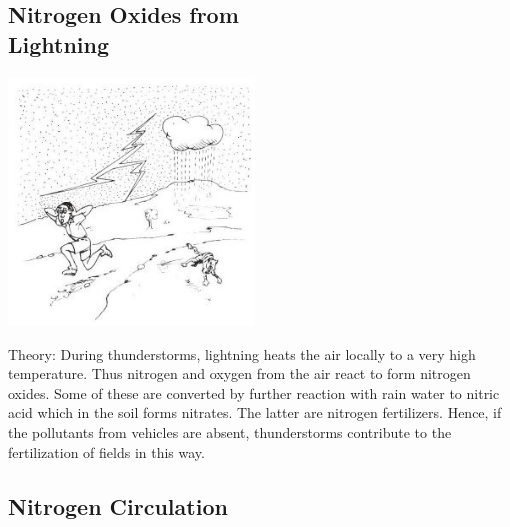 \begin{multicols}{2}
\subsection[Nitrogen Oxides from Lightning]{Nitrogen Oxides from \hfill \\ Lightning}

\begin{center}
\includegraphics[width=0.49\textwidth]{./img/source/nitrogen-lightning-2.jpg}
\end{center}

\begin{description*}
\item[Theory:]{During thunderstorms, lightning heats
the air locally to a very high temperature. Thus
nitrogen and oxygen from the air react to form
nitrogen oxides. Some of these are converted by
further reaction with rain water to nitric acid
which in the soil forms nitrates. The latter are
nitrogen fertilizers. Hence, if the pollutants
from vehicles are absent,
thunderstorms contribute to the fertilization of
fields in this way.}
\end{description*}

\columnbreak

\subsection{Nitrogen Circulation}


\end{multicols}
